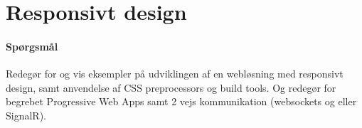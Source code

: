 \section{Responsivt design}

\paragraph{Spørgsmål}
Redegør for og vis eksempler på udviklingen af en webløsning med responsivt design, samt anvendelse af CSS preprocessors og build tools. Og redegør for begrebet Progressive Web Apps samt 2 vejs	kommunikation (websockets og eller SignalR).
